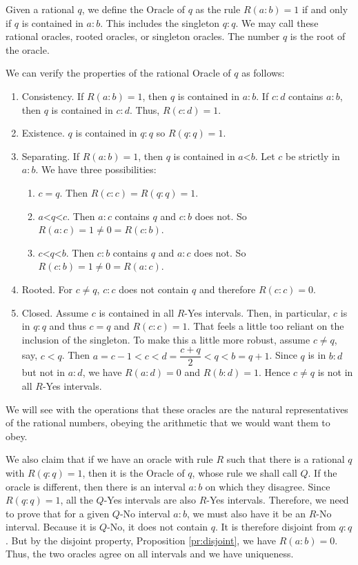 \documentclass[12pt]{article}
\theoremstyle{remark}
\newcommand{\lt}{\mathord{<}}
\begin{document}
Given a rational $q$, we define the Oracle of $q$ as the rule $R(a:b) = 1$ if and only if $q$ is contained in $a:b$. This includes the singleton $q:q$.  We may call these rational oracles, rooted oracles, or singleton oracles. The number $q$ is the root of the oracle. 

We can verify the properties of the rational Oracle of $q$ as follows: 

\begin{enumerate}
    \item Consistency. If $R(a:b)=1$, then $q$ is contained in $a:b$. If $c:d$ contains $a:b$, then $q$ is contained in $c:d$. Thus, $R(c:d)=1$.
    \item Existence. $q$ is contained in $q:q$ so $R(q:q)=1$.
    \item Separating. If $R(a:b) =1$, then $q$ is contained in $a\lt b$. Let $c$ be strictly in $a:b$. We have three possibilities: 
    \begin{enumerate}
    \item $c=q$. Then $R(c:c) = R(q:q) = 1$.
    \item $a \lt q \lt c$. Then $a:c$ contains $q$ and $c:b$ does not. So $R(a:c)=1 \neq 0 =R(c:b)$.
    \item $c \lt q \lt b$. Then $c:b$ contains $q$ and $a:c$ does not. So $R(c:b)=1 \neq 0 =R(a:c)$.
    \end{enumerate}    
    \item Rooted. For $c \neq q$, $c:c$ does not contain $q$ and therefore $R(c:c)=0$.
    \item Closed. Assume $c$ is contained in all $R$-Yes intervals. Then, in particular, $c$ is in $q:q$ and thus $c=q$ and $R(c:c)=1$. That feels a little too reliant on the inclusion of the singleton. To make this a little more robust, assume $c \neq q$, say, $c < q$. Then  $a=c-1 < c < d=\dfrac{c+q}{2} < q < b=q+1$. Since $q$ is in $b:d$ but not in $a:d$, we have $R(a:d)=0$ and $R(b:d)=1$. Hence $c \neq q$ is not in all $R$-Yes intervals.
\end{enumerate}

We will see with the operations that these oracles are the natural representatives of the rational numbers, obeying the arithmetic that we would want them to obey.  

We also claim that if we have an oracle with rule $R$ such that there is a rational $q$ with $R(q:q)=1$, then it is the Oracle of $q$, whose rule we shall call $Q$. If the oracle is different, then there is an interval $a:b$ on which they disagree. Since $R(q:q) =1$, all the  $Q$-Yes intervals are also $R$-Yes intervals. Therefore, we need to prove that for a given  $Q$-No interval $a:b$, we must also have it be an $R$-No interval. Because it is $Q$-No, it does not contain $q$. It is therefore disjoint from $q:q$. But by the disjoint property, Proposition \ref{pr:disjoint}, we have $R(a:b)=0$. Thus, the two oracles agree on all intervals and we have uniqueness. 
\end{document}
